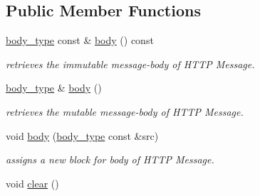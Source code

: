 \subsection*{Public Member Functions}
\begin{DoxyCompactItemize}
\item 
\hypertarget{classhryky_1_1http_1_1request_1_1_entity_a495710707c5b29ad297513d5692fdc27}{\hyperlink{classhryky_1_1http_1_1body_1_1_entity}{body\-\_\-type} const \& \hyperlink{classhryky_1_1http_1_1request_1_1_entity_a495710707c5b29ad297513d5692fdc27}{body} () const }\label{classhryky_1_1http_1_1request_1_1_entity_a495710707c5b29ad297513d5692fdc27}

\begin{DoxyCompactList}\small\item\em retrieves the immutable message-\/body of H\-T\-T\-P Message. \end{DoxyCompactList}\item 
\hypertarget{classhryky_1_1http_1_1request_1_1_entity_a6cf320b5887642b1c8f6fe457beb3c4f}{\hyperlink{classhryky_1_1http_1_1body_1_1_entity}{body\-\_\-type} \& \hyperlink{classhryky_1_1http_1_1request_1_1_entity_a6cf320b5887642b1c8f6fe457beb3c4f}{body} ()}\label{classhryky_1_1http_1_1request_1_1_entity_a6cf320b5887642b1c8f6fe457beb3c4f}

\begin{DoxyCompactList}\small\item\em retrieves the mutable message-\/body of H\-T\-T\-P Message. \end{DoxyCompactList}\item 
\hypertarget{classhryky_1_1http_1_1request_1_1_entity_aecfb472023d10949f07f5d23edf4e238}{void \hyperlink{classhryky_1_1http_1_1request_1_1_entity_aecfb472023d10949f07f5d23edf4e238}{body} (\hyperlink{classhryky_1_1http_1_1body_1_1_entity}{body\-\_\-type} const \&src)}\label{classhryky_1_1http_1_1request_1_1_entity_aecfb472023d10949f07f5d23edf4e238}

\begin{DoxyCompactList}\small\item\em assigns a new block for body of H\-T\-T\-P Message. \end{DoxyCompactList}\item 
\hypertarget{classhryky_1_1http_1_1request_1_1_entity_a9783db65c403aa91112d218cb2f2a19b}{void \hyperlink{classhryky_1_1http_1_1request_1_1_entity_a9783db65c403aa91112d218cb2f2a19b}{clear} ()}\label{classhryky_1_1http_1_1request_1_1_entity_a9783db65c403aa91112d218cb2f2a19b}


\end{DoxyCompactItemize}
